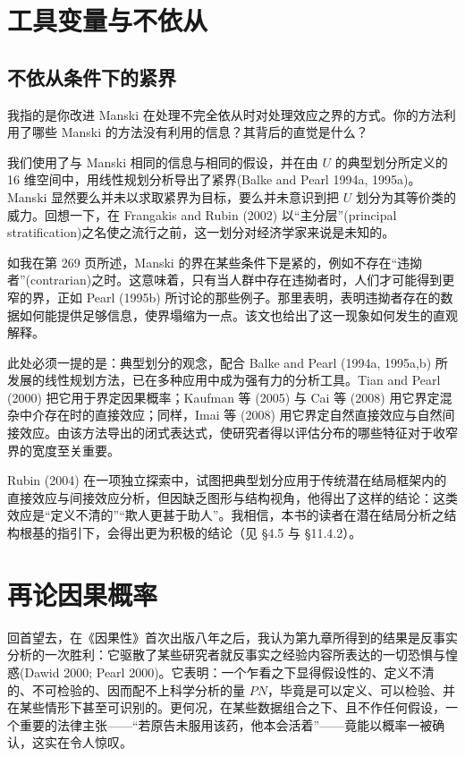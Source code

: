 \section{工具变量与不依从}

\subsection{不依从条件下的紧界}


我指的是你改进 Manski 在处理不完全依从时对处理效应之界的方式。你的方法利用了哪些 Manski 的方法没有利用的信息？其背后的直觉是什么？


我们使用了与 Manski 相同的信息与相同的假设，并在由 $U$ 的典型划分所定义的 16 维空间中，用线性规划分析导出了紧界(Balke and Pearl 1994a, 1995a)。Manski 显然要么并未以求取紧界为目标，要么并未意识到把 $U$ 划分为其等价类的威力。回想一下，在 Frangakis and Rubin (2002) 以“主分层”(principal stratification)之名使之流行之前，这一划分对经济学家来说是未知的。

如我在第 269 页所述，Manski 的界在某些条件下是紧的，例如不存在“违拗者”(contrarian)之时。这意味着，只有当人群中存在违拗者时，人们才可能得到更窄的界，正如 Pearl (1995b) 所讨论的那些例子。那里表明，表明违拗者存在的数据如何能提供足够信息，使界塌缩为一点。该文也给出了这一现象如何发生的直观解释。

此处必须一提的是：典型划分的观念，配合 Balke and Pearl (1994a, 1995a,b) 所发展的线性规划方法，已在多种应用中成为强有力的分析工具。Tian and Pearl (2000) 把它用于界定因果概率；Kaufman 等 (2005) 与 Cai 等 (2008) 用它界定混杂中介存在时的直接效应；同样，Imai 等 (2008) 用它界定自然直接效应与自然间接效应。由该方法导出的闭式表达式，使研究者得以评估分布的哪些特征对于收窄界的宽度至关重要。

Rubin (2004) 在一项独立探索中，试图把典型划分应用于传统潜在结局框架内的直接效应与间接效应分析，但因缺乏图形与结构视角，他得出了这样的结论：这类效应是“定义不清的”“欺人更甚于助人”。我相信，本书的读者在潜在结局分析之结构根基的指引下，会得出更为积极的结论（见 \S4.5 与 \S11.4.2）。

\section{再论因果概率}

回首望去，在《因果性》首次出版八年之后，我认为第九章所得到的结果是反事实分析的一次胜利：它驱散了某些研究者就反事实之经验内容所表达的一切恐惧与惶惑(Dawid 2000; Pearl 2000)。它表明：一个乍看之下显得假设性的、定义不清的、不可检验的、因而配不上科学分析的量 $PN$，毕竟是可以定义、可以检验、并在某些情形下甚至可识别的。更何况，在某些数据组合之下、且不作任何假设，一个重要的法律主张——“若原告未服用该药，他本会活着”——竟能以概率一被确认，这实在令人惊叹。

